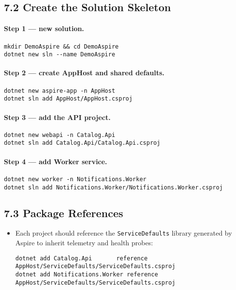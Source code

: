 \documentclass[table]{article}
\begin{document}
\subsection*{7.2 \faProjectDiagram\enspace Create the Solution Skeleton}
\paragraph{Step 1 — new solution.}
\begin{verbatim}
mkdir DemoAspire && cd DemoAspire
dotnet new sln --name DemoAspire
\end{verbatim}

\paragraph{Step 2 — create AppHost and shared defaults.}
\begin{verbatim}
dotnet new aspire-app -n AppHost
dotnet sln add AppHost/AppHost.csproj
\end{verbatim}

\paragraph{Step 3 — add the API project.}
\begin{verbatim}
dotnet new webapi -n Catalog.Api
dotnet sln add Catalog.Api/Catalog.Api.csproj
\end{verbatim}

\paragraph{Step 4 — add Worker service.}
\begin{verbatim}
dotnet new worker -n Notifications.Worker
dotnet sln add Notifications.Worker/Notifications.Worker.csproj
\end{verbatim}

\subsection*{7.3 \faTools\enspace Package References}
\begin{itemize}
  \item Each project should reference the \texttt{ServiceDefaults} library
    generated by Aspire to inherit telemetry and health probes:
\begin{verbatim}
dotnet add Catalog.Api       reference AppHost/ServiceDefaults/ServiceDefaults.csproj
dotnet add Notifications.Worker reference AppHost/ServiceDefaults/ServiceDefaults.csproj
\end{verbatim}
\end{itemize}
\end{document}
